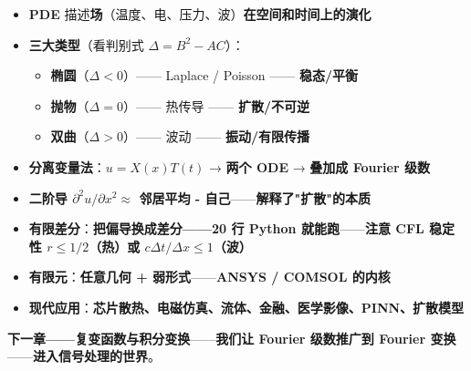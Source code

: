 \begin{tcolorbox}[essbox={本章核心}]
\begin{itemize}
\item \textbf{PDE} 描述\textbf{场}（温度、电、压力、波）\textbf{在空间和时间上的演化}
\item \textbf{三大类型}（看判别式 $\Delta = B^2 - AC$）：
   \begin{itemize}
   \item \textbf{椭圆}（$\Delta < 0$）—— Laplace / Poisson —— \textbf{稳态/平衡}
   \item \textbf{抛物}（$\Delta = 0$）—— 热传导 —— \textbf{扩散/不可逆}
   \item \textbf{双曲}（$\Delta > 0$）—— 波动 —— \textbf{振动/有限传播}
   \end{itemize}
\item \textbf{分离变量法}：\textbf{$u = X(x)T(t)$} → \textbf{两个 ODE} → \textbf{叠加成 Fourier 级数}
\item \textbf{二阶导 $\partial^2 u / \partial x^2 \approx$ 邻居平均 - 自己}——\textbf{解释了"扩散"的本质}
\item \textbf{有限差分}：\textbf{把偏导换成差分——20 行 Python 就能跑}——\textbf{注意 CFL 稳定性 $r \le 1/2$（热）或 $c\Delta t/\Delta x \le 1$（波）}
\item \textbf{有限元}：\textbf{任意几何 + 弱形式}——\textbf{ANSYS / COMSOL 的内核}
\item \textbf{现代应用}：\textbf{芯片散热、电磁仿真、流体、金融、医学影像、PINN、扩散模型}
\end{itemize}
\end{tcolorbox}

\textbf{下一章——复变函数与积分变换}——\textbf{我们让 Fourier 级数推广到 Fourier \textbf{变换}}——\textbf{进入信号处理的世界}。

\clearpage
